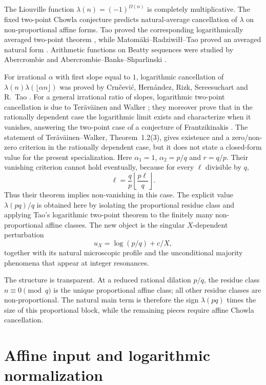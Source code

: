 \documentclass[preprint,12pt]{elsarticle}
\numberwithin{equation}{section}
\theoremstyle{plain}
\theoremstyle{definition}
\theoremstyle{remark}
\begin{document}
The Liouville function $\lambda(n)=(-1)^{\Omega(n)}$ is completely
multiplicative. The fixed two-point Chowla conjecture predicts natural-average
cancellation of $\lambda$ on non-proportional affine forms. Tao proved the
corresponding logarithmically averaged two-point theorem
\cite{Tao2016}, while Matom\"aki--Radziwi{\l}{\l}--Tao proved an averaged
natural form \cite{MRT2015}. Arithmetic functions on Beatty sequences were
studied by Abercrombie \cite{Abercrombie1995} and
Abercrombie--Banks--Shparlinski \cite{AbercrombieBanksShparlinski2009}.

For irrational $\alpha$ with first slope equal to $1$, logarithmic
cancellation of
$\lambda(n)\lambda(\lfloor\alpha n\rfloor)$ was proved by
Crn\v{c}evi\'c, Hern\'andez, Rizk, Sereesuchart and R.~Tao
\cite{CHRST2024}. For a general irrational ratio of slopes, logarithmic
two-point cancellation is due to Ter\"av\"ainen and Walker
\cite[Theorem~1.2]{TeravainenWalker2025}; they moreover prove that in the
rationally dependent case the logarithmic limit exists and characterize when
it vanishes, answering the two-point case of a conjecture of Frantzikinakis
\cite{Frantzikinakis2020}. The statement of Ter\"av\"ainen--Walker, Theorem~1.2(3), gives existence
and a zero/non-zero criterion in the rationally dependent case, but it does
not state a closed-form value for the present specialization. Here
$\alpha_1=1$, $\alpha_2=p/q$ and $r=q/p$. Their vanishing criterion cannot
hold eventually, because for every $\ell$ divisible by $q$,
\[
\ell=\frac qp\left\lfloor\frac{p\ell}{q}\right\rfloor.
\]
Thus their theorem implies non-vanishing in this case. The explicit value
$\lambda(pq)/q$ is obtained here by isolating the proportional residue class
and applying Tao's logarithmic two-point theorem to the finitely many
non-proportional affine classes. The new object is the singular
$X$-dependent perturbation
\[
u_X=\log(p/q)+c/X,
\]
together with its natural microscopic profile and the unconditional majority
phenomena that appear at integer resonances.

The structure is transparent. At a reduced rational dilation $p/q$, the
residue class $n\equiv0\pmod q$ is the unique proportional affine class; all
other residue classes are non-proportional. The natural main term is therefore
the sign $\lambda(pq)$ times the size of this proportional block, while the
remaining pieces require affine Chowla cancellation.

\section{Affine input and logarithmic normalization}
\label{sec:input}
\end{document}

